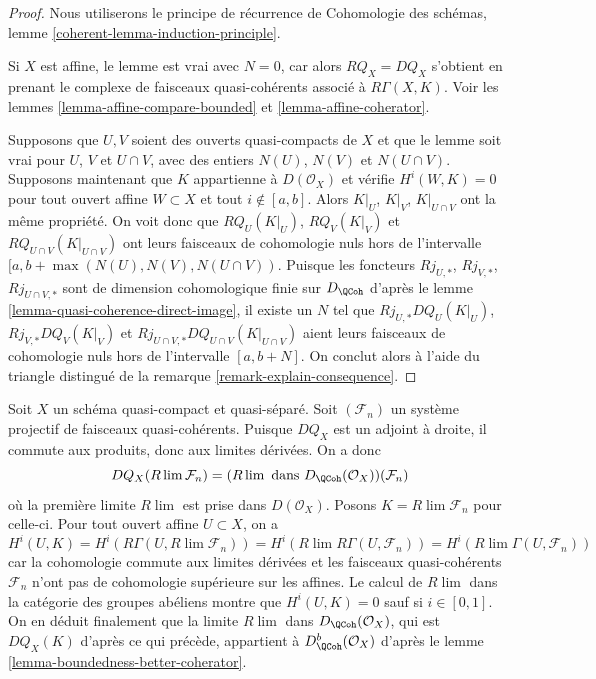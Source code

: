 \begin{proof}
Nous utiliserons le principe de récurrence de
Cohomologie des schémas, lemme \ref{coherent-lemma-induction-principle}.

\medskip\noindent
Si $X$ est affine, le lemme est vrai avec $N = 0$, car alors
$RQ_X = DQ_X$ s'obtient en prenant le complexe de faisceaux
quasi-cohérents associé à $R\Gamma(X, K)$.
Voir les lemmes \ref{lemma-affine-compare-bounded} et \ref{lemma-affine-coherator}.

\medskip\noindent
Supposons que $U, V$ soient des ouverts quasi-compacts de $X$
et que le lemme soit vrai pour $U$, $V$ et $U \cap V$,
avec des entiers $N(U)$, $N(V)$ et $N(U \cap V)$.
Supposons maintenant que $K$ appartienne à $D(\mathcal{O}_X)$ et vérifie
$H^i(W, K) = 0$ pour tout ouvert affine $W \subset X$ et tout $i \not \in [a, b]$.
Alors $K|_U$, $K|_V$, $K|_{U \cap V}$ ont la même propriété.
On voit donc que $RQ_U(K|_U)$, $RQ_V(K|_V)$ et
$RQ_{U \cap V}(K|_{U \cap V})$ ont leurs faisceaux de cohomologie
nuls hors de l'intervalle $[a, b + \max(N(U), N(V), N(U \cap V))$.
Puisque les foncteurs $Rj_{U, *}$, $Rj_{V, *}$, $Rj_{U \cap V, *}$
sont de dimension cohomologique finie sur $D_\QCoh$ d'après le
lemme \ref{lemma-quasi-coherence-direct-image},
il existe un $N$ tel que
$Rj_{U, *}DQ_U(K|_U)$, $Rj_{V, *}DQ_V(K|_V)$ et
$Rj_{U \cap V, *}DQ_{U \cap V}(K|_{U \cap V})$ aient leurs faisceaux
de cohomologie nuls hors de l'intervalle $[a, b + N]$.
On conclut alors à l'aide du triangle distingué
de la remarque \ref{remark-explain-consequence}.
\end{proof}

\begin{example}
\label{example-inverse-limit-quasi-coherent}
Soit $X$ un schéma quasi-compact et quasi-séparé. Soit $(\mathcal{F}_n)$
un système projectif de faisceaux quasi-cohérents. Puisque $DQ_X$ est un adjoint à
droite, il commute aux produits, donc aux limites dérivées.
On a donc
$$
DQ_X(R\lim \mathcal{F}_n) =
(R\lim\text{ dans }D_\QCoh(\mathcal{O}_X))(\mathcal{F}_n)
$$
où la première limite $R\lim$ est prise dans $D(\mathcal{O}_X)$.
Posons $K = R\lim \mathcal{F}_n$ pour celle-ci.
Pour tout ouvert affine $U \subset X$, on a
$$
H^i(U, K) =
H^i(R\Gamma(U, R\lim \mathcal{F}_n)) =
H^i(R\lim R\Gamma(U, \mathcal{F}_n)) =
H^i(R\lim \Gamma(U, \mathcal{F}_n))
$$
car la cohomologie commute aux limites dérivées et les
faisceaux quasi-cohérents
$\mathcal{F}_n$ n'ont pas de cohomologie supérieure sur les affines.
Le calcul de $R\lim$ dans la catégorie des groupes
abéliens montre que $H^i(U, K) = 0$
sauf si $i \in [0, 1]$. On en déduit finalement que
la limite $R\lim$ dans $D_\QCoh(\mathcal{O}_X)$, qui est
$DQ_X(K)$ d'après ce qui précède, appartient à $D^b_\QCoh(\mathcal{O}_X)$
d'après le lemme \ref{lemma-boundedness-better-coherator}.
\end{example}













